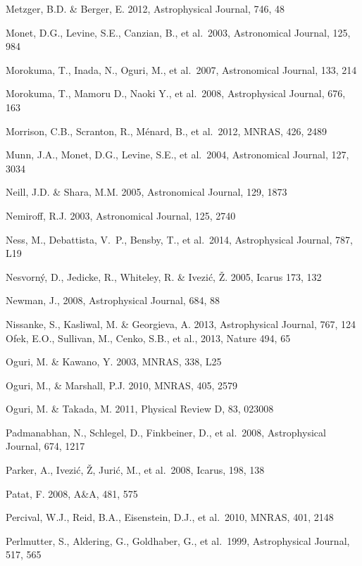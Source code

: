 \documentclass{emulateapj}
\begin{document}
\begin{thebibliography}{}
\bibitem[()]{} Metzger, B.D. \& Berger, E. 2012, Astrophysical Journal, 746, 48

\bibitem[()]{} Monet, D.G., Levine, S.E., Canzian, B., et al.~2003, Astronomical Journal, 125, 984

\bibitem[()]{} Morokuma, T., Inada, N., Oguri, M., et al.~2007, Astronomical Journal, 133, 214

\bibitem[()]{} Morokuma, T., Mamoru D., Naoki Y., et al.~2008, Astrophysical Journal, 676, 163

\bibitem[()]{} Morrison, C.B., Scranton, R., M\'{e}nard, B., et al.~2012, MNRAS, 426, 2489

\bibitem[()]{} Munn, J.A., Monet, D.G., Levine, S.E., et al.~2004, Astronomical Journal, 127, 3034

\bibitem[()]{} Neill, J.D. \& Shara, M.M. 2005, Astronomical Journal, 129, 1873

\bibitem[()]{} Nemiroff, R.J. 2003, Astronomical Journal, 125, 2740

\bibitem[()]{} Ness, M., Debattista, V.~P., Bensby, T., et al.~2014, Astrophysical Journal, 787, L19

\bibitem[()]{} Nesvorn\'{y}, D., Jedicke, R., Whiteley, R. \& Ivezi\'{c}, \v{Z}. 2005, Icarus 173, 132

\bibitem[()]{} Newman, J., 2008, Astrophysical Journal, 684, 88

\bibitem[()]{} Nissanke, S., Kasliwal, M. \& Georgieva, A. 2013,  Astrophysical Journal, 767, 124
\bibitem[()]{} Ofek, E.O.,  Sullivan, M., Cenko, S.B., et al., 2013, Nature 494, 65

\bibitem[()]{} Oguri, M. \& Kawano, Y. 2003, MNRAS, 338, L25

\bibitem[()]{} Oguri, M., \& Marshall, P.J. 2010, MNRAS, 405, 2579

\bibitem[()]{} Oguri, M. \& Takada, M. 2011, Physical Review D, 83, 023008

\bibitem[()]{} Padmanabhan, N., Schlegel, D., Finkbeiner, D., et al.~2008, Astrophysical Journal, 674, 1217

\bibitem[()]{} Parker, A., Ivezi\'{c}, \v{Z}, Juri\'{c}, M., et al.~2008, Icarus, 198, 138

\bibitem[()]{} Patat, F. 2008, A\&A, 481, 575

\bibitem[()]{} Percival, W.J., Reid, B.A., Eisenstein, D.J., et al.~2010, MNRAS, 401, 2148

\bibitem[()]{} Perlmutter, S., Aldering, G., Goldhaber, G., et al.~1999, Astrophysical Journal, 517, 565


\end{thebibliography}
\end{document}
